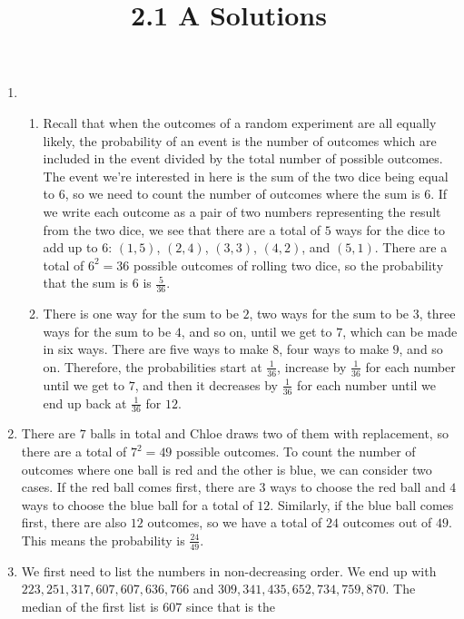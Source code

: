 \documentclass{article}
\title{2.1 A Solutions}
\author{}
\date{}
\begin{document}
\maketitle

\begin{enumerate}
	\item \begin{enumerate}
			\item Recall that when the outcomes of a random experiment are all 
				equally likely, the probability of an event is the number of 
				outcomes which are included in the event divided by the total 
				number of possible outcomes. The event we're interested in here 
				is the sum of the two dice being equal to $6$, so we need to 
				count the number of outcomes where the sum is $6$. If we write 
				each outcome as a pair of two numbers representing the result 
				from the two dice, we see that there are a total of $5$ ways for 
				the dice to add up to $6$: $(1, 5)$, $(2, 4)$, $(3, 3)$, $(4, 
				2)$, and $(5, 1)$. There are a total of $6^2 = 36$ possible 
				outcomes of rolling two dice, so the probability that the sum is 
				$6$ is $\frac{5}{36}$.
			\item There is one way for the sum to be $2$, two ways for the sum 
				to be $3$, three ways for the sum to be $4$, and so on, until we 
				get to $7$, which can be made in six ways. There are five ways 
				to make $8$, four ways to make $9$, and so on. Therefore, the 
				probabilities start at $\frac{1}{36}$, increase by 
				$\frac{1}{36}$ for each number until we get to $7$, and then it 
				decreases by $\frac{1}{36}$ for each number until we end up back 
				at $\frac{1}{36}$ for $12$.
		\end{enumerate}
	\item There are $7$ balls in total and Chloe draws two of them with 
		replacement, so there are a total of $7^2 = 49$ possible outcomes. To 
		count the number of outcomes where one ball is red and the other is 
		blue, we can consider two cases. If the red ball comes first, there are 
		$3$ ways to choose the red ball and $4$ ways to choose the blue ball for 
		a total of $12$. Similarly, if the blue ball comes first, there are also 
		$12$ outcomes, so we have a total of $24$ outcomes out of $49$. This 
		means the probability is $\frac{24}{49}$.
	\item We first need to list the numbers in non-decreasing order. We end up 
		with $223, 251, 317, 607, 607, 636, 766$ and $309, 341, 435, 652, 734, 
		759, 870$. The median of the first list is $607$ since that is the 

\end{enumerate}
\end{document}
